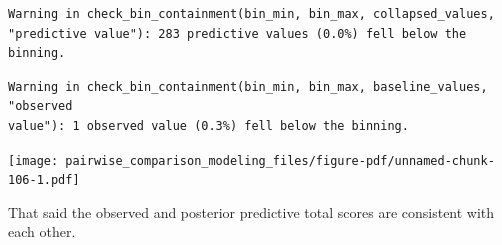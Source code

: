 \documentclass[
  letterpaper,
  DIV=11,
  numbers=noendperiod]{scrartcl}
\newenvironment{Shaded}{\begin{snugshade}}{\end{snugshade}}
\newcommand{\AttributeTok}[1]{\textcolor[rgb]{0.40,0.45,0.13}{#1}}
\newcommand{\DecValTok}[1]{\textcolor[rgb]{0.68,0.00,0.00}{#1}}
\newcommand{\FunctionTok}[1]{\textcolor[rgb]{0.28,0.35,0.67}{#1}}
\newcommand{\NormalTok}[1]{\textcolor[rgb]{0.00,0.23,0.31}{#1}}
\newcommand{\SpecialCharTok}[1]{\textcolor[rgb]{0.37,0.37,0.37}{#1}}
\newcommand{\StringTok}[1]{\textcolor[rgb]{0.13,0.47,0.30}{#1}}
\begin{document}
\begin{Shaded}
\end{Shaded}

\begin{verbatim}
Warning in check_bin_containment(bin_min, bin_max, collapsed_values,
"predictive value"): 283 predictive values (0.0%) fell below the binning.
\end{verbatim}

\begin{verbatim}
Warning in check_bin_containment(bin_min, bin_max, baseline_values, "observed
value"): 1 observed value (0.3%) fell below the binning.
\end{verbatim}

\texttt{[image: pairwise\_comparison\_modeling\_files/figure-pdf/unnamed-chunk-106-1.pdf]}

That said the observed and posterior predictive total scores are
consistent with each other.

\begin{Shaded}
\end{Shaded}
\end{document}
